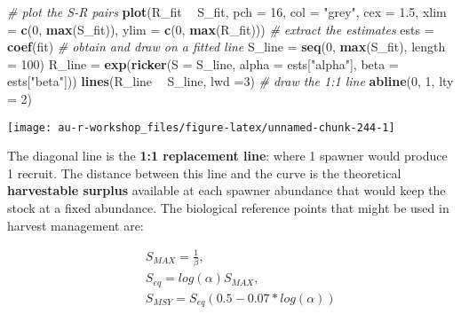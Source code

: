 \documentclass[]{book}
\newenvironment{Shaded}{\begin{snugshade}}{\end{snugshade}}
\newcommand{\KeywordTok}[1]{\textcolor[rgb]{0.13,0.29,0.53}{\textbf{#1}}}
\newcommand{\DataTypeTok}[1]{\textcolor[rgb]{0.13,0.29,0.53}{#1}}
\newcommand{\DecValTok}[1]{\textcolor[rgb]{0.00,0.00,0.81}{#1}}
\newcommand{\FloatTok}[1]{\textcolor[rgb]{0.00,0.00,0.81}{#1}}
\newcommand{\StringTok}[1]{\textcolor[rgb]{0.31,0.60,0.02}{#1}}
\newcommand{\CommentTok}[1]{\textcolor[rgb]{0.56,0.35,0.01}{\textit{#1}}}
\newcommand{\OperatorTok}[1]{\textcolor[rgb]{0.81,0.36,0.00}{\textbf{#1}}}
\newcommand{\NormalTok}[1]{#1}
\theoremstyle{definition}
\theoremstyle{definition}
\theoremstyle{definition}
\theoremstyle{remark}
\begin{document}
\begin{Shaded}
\begin{Highlighting}[]
\CommentTok{# plot the S-R pairs}
\KeywordTok{plot}\NormalTok{(R_fit }\OperatorTok{~}\StringTok{ }\NormalTok{S_fit, }\DataTypeTok{pch =} \DecValTok{16}\NormalTok{, }\DataTypeTok{col =} \StringTok{"grey"}\NormalTok{, }\DataTypeTok{cex =} \FloatTok{1.5}\NormalTok{,}
     \DataTypeTok{xlim =} \KeywordTok{c}\NormalTok{(}\DecValTok{0}\NormalTok{, }\KeywordTok{max}\NormalTok{(S_fit)), }\DataTypeTok{ylim =} \KeywordTok{c}\NormalTok{(}\DecValTok{0}\NormalTok{, }\KeywordTok{max}\NormalTok{(R_fit)))}
\CommentTok{# extract the estimates}
\NormalTok{ests =}\StringTok{ }\KeywordTok{coef}\NormalTok{(fit)}
\CommentTok{# obtain and draw on a fitted line}
\NormalTok{S_line =}\StringTok{ }\KeywordTok{seq}\NormalTok{(}\DecValTok{0}\NormalTok{, }\KeywordTok{max}\NormalTok{(S_fit), }\DataTypeTok{length =} \DecValTok{100}\NormalTok{)}
\NormalTok{R_line =}\StringTok{ }\KeywordTok{exp}\NormalTok{(}\KeywordTok{ricker}\NormalTok{(}\DataTypeTok{S =}\NormalTok{ S_line,}
                \DataTypeTok{alpha =}\NormalTok{ ests[}\StringTok{"alpha"}\NormalTok{],}
                \DataTypeTok{beta =}\NormalTok{ ests[}\StringTok{"beta"}\NormalTok{]))}
\KeywordTok{lines}\NormalTok{(R_line }\OperatorTok{~}\StringTok{ }\NormalTok{S_line, }\DataTypeTok{lwd =}\DecValTok{3}\NormalTok{)}
\CommentTok{# draw the 1:1 line}
\KeywordTok{abline}\NormalTok{(}\DecValTok{0}\NormalTok{, }\DecValTok{1}\NormalTok{, }\DataTypeTok{lty =} \DecValTok{2}\NormalTok{)}
\end{Highlighting}
\end{Shaded}

\begin{center}\texttt{[image: au-r-workshop\_files/figure-latex/unnamed-chunk-244-1]} \end{center}

The diagonal line is the \textbf{1:1 replacement line}: where 1 spawner
would produce 1 recruit. The distance between this line and the curve is
the theoretical \textbf{harvestable surplus} available at each spawner
abundance that would keep the stock at a fixed abundance. The biological
reference points that might be used in harvest management are:

\begin{eqnarray*}
&& S_{MAX}=\frac{1}{\beta},\\
&& S_{eq}=log(\alpha) S_{MAX},\\
&& S_{MSY}=S_{eq} \left(0.5-0.07*log(\alpha)\right)
\end{eqnarray*}
\end{document}
